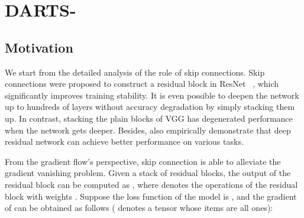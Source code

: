 \documentclass{article} \usepackage{iclr2021_conference,times}
\begin{document}
\section{DARTS-}


\begin{comment}
Following one-shot based NAS~ \citep{one-shot NAS}, DARTS~ \citep{liu2018darts} constructs neural networks by stacking normal and reduction cells and utilizes a directed acyclic graph (DAG) to represent the architecture of a cell.  nodes, which represents a feature map, are contained in each cell in sequential order, and node  connects with all the previous nodes in the same cell. We denote the edge from node  to  as , which contains all the candidate operations in the search space . Furthermore, DARTS~ \citep{liu2018darts} leads in the architecture parameters  to control the importance of different operations and connections. Consequently, the output of edge , denoted as , is the weighted average of the output of operations 
 
where  is the output of node , and the output of node  can be computed as:
 
Neural architecture search can be modeled as a bilevel optimization problem as Eq.~\ref{eq:}, where  is the network parameters and  is the architecture parameters:

\end{comment}

\subsection{Motivation}


We start from the detailed analysis of the role of skip connections. Skip connections were proposed to construct a residual block in ResNet~ \citep{he2016deep}, which  significantly improves training stability.  It is even possible to deepen the network up to hundreds of layers without accuracy degradation by simply stacking them up. In contrast, stacking the plain blocks of VGG has degenerated performance when the network gets deeper. Besides, \cite{ren2015faster, wei2017boosting,tai2017image,li2018multi} also empirically demonstrate that deep residual network can achieve better performance on various tasks. 

From the gradient flow's perspective, skip connection is able to alleviate the gradient vanishing problem. Given a stack of  residual blocks, the output of the  residual block  can be computed as
, 
where  denotes the operations of the  residual block with weights . Suppose the loss function of the model is , and the gradient of  can be obtained as follows ( denotes a tensor whose items are all ones):
\end{document}
